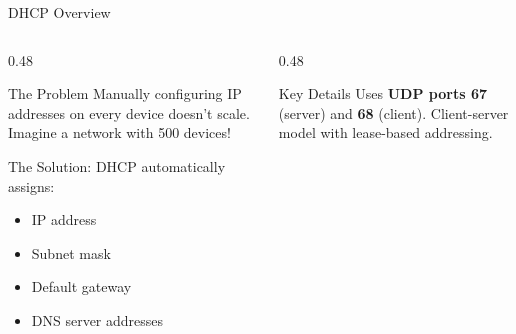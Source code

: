 \documentclass[aspectratio=169]{beamer}  %
\begin{document}
\begin{frame}{DHCP Overview}
    \begin{columns}[T]
        \begin{column}{0.48\textwidth}
            \begin{block}{The Problem}
                \small
                Manually configuring IP addresses on every device doesn't scale. Imagine a network with 500 devices!
            \end{block}
            
            \vspace{0.2em}
            \begin{block}{The Solution: DHCP}
                \small
                 automatically assigns:
                \begin{itemize}\setlength{\itemsep}{1pt}
                    \item IP address
                    \item Subnet mask
                    \item Default gateway
                    \item DNS server addresses
                \end{itemize}
            \end{block}
           
        \end{column}
        \begin{column}{0.48\textwidth}
             \begin{alertblock}{Key Details}
                \small
                Uses \textbf{UDP ports 67} (server) and \textbf{68} (client). Client-server model with lease-based addressing.
            \end{alertblock}

            \begin{center}
\end{center}
\end{column}
\end{columns}
\end{frame}
\end{document}
